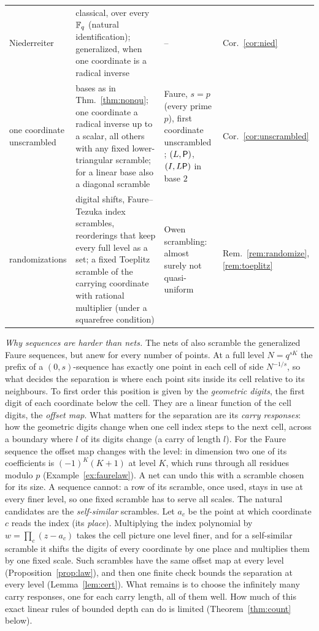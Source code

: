 \begin{table}[t]
\begin{tabular}{@{}>{\raggedright\arraybackslash}p{}>{\raggedright\arraybackslash}p{}>{\raggedright\arraybackslash}p{}>{\raggedright\arraybackslash}p{}@{}}
Niederreiter & classical, over every $\mathbb{F}_q$ (natural identification); generalized, when one coordinate is a radical inverse & -- & Cor.~\ref{cor:nied}\\
one coordinate unscrambled & bases as in Thm.~\ref{thm:nonqu}; one coordinate a radical inverse up to a scalar, all others with any fixed lower-triangular scramble; for a linear base also a diagonal scramble & Faure, $s=p$ (every prime $p$), first coordinate unscrambled \cite[Rem.~3]{GHS26}; $(L,\mathsf{P})$, $(I,L\mathsf{P})$ in base $2$ \cite[Thm.~4.2]{DGS2} & Cor.~\ref{cor:unscrambled}\\
randomizations & digital shifts, Faure--Tezuka index scrambles, reorderings that keep every full level as a set; a fixed Toeplitz scramble of the carrying coordinate with rational multiplier (under a squarefree condition) & Owen scrambling: almost surely not quasi-uniform \cite{Suz26} & Rem.~\ref{rem:randomize}, \ref{rem:toeplitz}\\
\bottomrule
\end{tabular}
\end{table}

\emph{Why sequences are harder than nets.} The nets of \cite{Gru26geo} also scramble the generalized Faure sequences, but anew for every number of points. At a full level $N=q^{sK}$ the prefix of a $(0,s)$-sequence has exactly one point in each cell of side $N^{-1/s}$, so what decides the separation is where each point sits inside its cell relative to its neighbours. To first order this position is given by the \emph{geometric digits}, the first digit of each coordinate below the cell. They are a linear function of the cell digits, the \emph{offset map}. What matters for the separation are its \emph{carry responses}: how the geometric digits change when one cell index steps to the next cell, across a boundary where $l$ of its digits change (a carry of length $l$). For the Faure sequence the offset map changes with the level: in dimension two one of its coefficients is $(-1)^K(K+1)$ at level $K$, which runs through all residues modulo $p$ (Example~\ref{ex:faurelaw}). A net can undo this with a scramble chosen for its size. A sequence cannot: a row of its scramble, once used, stays in use at every finer level, so one fixed scramble has to serve all scales. The natural candidates are the \emph{self-similar} scrambles. Let $a_c$ be the point at which coordinate $c$ reads the index (its \emph{place}). Multiplying the index polynomial by $w=\prod_c(z-a_c)$ takes the cell picture one level finer, and for a self-similar scramble it shifts the digits of every coordinate by one place and multiplies them by one fixed scale. Such scrambles have the same offset map at every level (Proposition~\ref{prop:law}), and then one finite check bounds the separation at every level (Lemma~\ref{lem:cert}). What remains is to choose the infinitely many carry responses, one for each carry length, all of them well. How much of this exact linear rules of bounded depth can do is limited (Theorem~\ref{thm:count} below).


